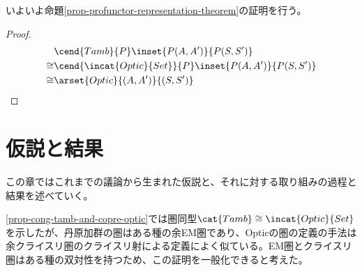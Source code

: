 \documentclass[uplatex,dvipdfmx]{jsarticle}
\begin{document}
  いよいよ命題\ref{prop-profunctor-representation-theorem}の証明を行う。
  \begin{proof}
    \begin{align*}
      &\cend{Tamb}{P}\inset{P(A,A')}{P(S,S')}\\
      \cong&\cend{\incat{Optic}{Set}}{P}\inset{P(A,A')}{P(S,S')}\\
      \cong&\arset{Optic}{(A,A')}{(S,S')}
    \end{align*}
  \end{proof}

  \section{仮説と結果}
  この章ではこれまでの議論から生まれた仮説と、それに対する取り組みの過程と結果を述べていく。

  \ref{prop-cong-tamb-and-copre-optic}では圏同型$\cat{Tamb}\cong\incat{Optic}{Set}$を示したが、丹原加群の圏はある種の余EM圏であり、Opticの圏の定義の手法は余クライスリ圏のクライスリ射による定義によく似ている。EM圏とクライスリ圏はある種の双対性を持つため、この証明を一般化できると考えた。
\end{document}
